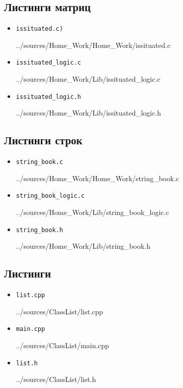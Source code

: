 \documentclass[12pt,a4paper]{report}
\begin{document}
\subsection*{Листинги матриц}
\begin{itemize}
\item[] \verb-issituated.c)-

{../sources/Home_Work/Home_Work/issituated.c}

\item[] \verb-issituated_logic.c-

{../sources/Home_Work/Lib/issituated_logic.c}

\item[] \verb-issituated_logic.h-

{../sources/Home_Work/Lib/issituated_logic.h}
\end{itemize}

\subsection*{Листинги строк}
\begin{itemize}
\item[] \verb-string_book.c-

{../sources/Home_Work/Home_Work/string_book.c}

\item[] \verb-string_book_logic.c-

{../sources/Home_Work/Lib/string_book_logic.c}

\item[] \verb-string_book.h-

{../sources/Home_Work/Lib/string_book.h}
\end{itemize}

\subsection*{Листинги}
\begin{itemize}
\item[] \verb-list.cpp-

{../sources/ClassList/list.cpp}

\item[] \verb-main.cpp-

{../sources/ClassList/main.cpp}

\item[] \verb-list.h-

{../sources/ClassList/list.h}
\end{itemize}
\end{document}

